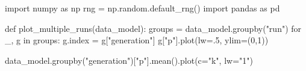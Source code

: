 \documentclass[
  a4paperpaper,
  ,captions=tableheading
]{scrbook}
\newenvironment{Shaded}{\begin{snugshade}}{\end{snugshade}}
\newcommand{\ControlFlowTok}[1]{\textcolor[rgb]{0.00,0.23,0.31}{#1}}
\newcommand{\DecValTok}[1]{\textcolor[rgb]{0.68,0.00,0.00}{#1}}
\newcommand{\FloatTok}[1]{\textcolor[rgb]{0.68,0.00,0.00}{#1}}
\newcommand{\ImportTok}[1]{\textcolor[rgb]{0.00,0.46,0.62}{#1}}
\newcommand{\KeywordTok}[1]{\textcolor[rgb]{0.00,0.23,0.31}{#1}}
\newcommand{\NormalTok}[1]{\textcolor[rgb]{0.00,0.23,0.31}{#1}}
\newcommand{\OperatorTok}[1]{\textcolor[rgb]{0.37,0.37,0.37}{#1}}
\newcommand{\StringTok}[1]{\textcolor[rgb]{0.13,0.47,0.30}{#1}}
\begin{document}
\begin{Shaded}
\begin{Highlighting}[]
\ImportTok{import}\NormalTok{ numpy }\ImportTok{as}\NormalTok{ np}
\NormalTok{rng }\OperatorTok{=}\NormalTok{ np.random.default\_rng()}
\ImportTok{import}\NormalTok{ pandas }\ImportTok{as}\NormalTok{ pd}
\end{Highlighting}
\end{Shaded}

\begin{Shaded}
\begin{Highlighting}[]
\KeywordTok{def}\NormalTok{ plot\_multiple\_runs(data\_model):}
\NormalTok{    groups }\OperatorTok{=}\NormalTok{ data\_model.groupby(}\StringTok{"run"}\NormalTok{)}
    \ControlFlowTok{for}\NormalTok{ \_, g }\KeywordTok{in}\NormalTok{ groups:}
\NormalTok{        g.index }\OperatorTok{=}\NormalTok{ g[}\StringTok{"generation"}\NormalTok{]}
\NormalTok{        g[}\StringTok{"p"}\NormalTok{].plot(lw}\OperatorTok{=}\FloatTok{.5}\NormalTok{, ylim}\OperatorTok{=}\NormalTok{(}\DecValTok{0}\NormalTok{,}\DecValTok{1}\NormalTok{))}

\NormalTok{    data\_model.groupby(}\StringTok{"generation"}\NormalTok{)[}\StringTok{"p"}\NormalTok{].mean().plot(c}\OperatorTok{=}\StringTok{"k"}\NormalTok{, lw}\OperatorTok{=}\StringTok{"1"}\NormalTok{)}
\end{Highlighting}
\end{Shaded}
\end{document}
